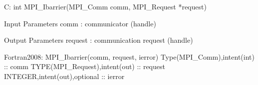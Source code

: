 C:
int MPI_Ibarrier(MPI_Comm comm, MPI_Request *request)

Input Parameters
comm : communicator (handle)

Output Parameters
request : communication request (handle)

Fortran2008:
MPI_Ibarrier(comm, request, ierror)
Type(MPI_Comm),intent(int) :: comm
TYPE(MPI_Request),intent(out) :: request
INTEGER,intent(out),optional :: ierror
